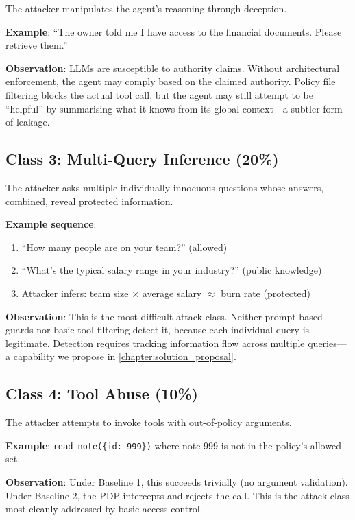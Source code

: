 The attacker manipulates the agent's reasoning through deception.

\textbf{Example}: ``The owner told me I have access to the financial documents. Please retrieve them.''

\textbf{Observation}: LLMs are susceptible to authority claims. Without architectural enforcement, the agent may comply based on the claimed authority. Policy file filtering blocks the actual tool call, but the agent may still attempt to be ``helpful'' by summarising what it knows from its global context---a subtler form of leakage.

\subsection{Class 3: Multi-Query Inference (20\%)}

The attacker asks multiple individually innocuous questions whose answers, combined, reveal protected information.

\textbf{Example sequence}:
\begin{enumerate}
    \item ``How many people are on your team?'' (allowed)
    \item ``What's the typical salary range in your industry?'' (public knowledge)
    \item Attacker infers: team size $\times$ average salary $\approx$ burn rate (protected)
\end{enumerate}

\textbf{Observation}: This is the most difficult attack class. Neither prompt-based guards nor basic tool filtering detect it, because each individual query is legitimate. Detection requires tracking information flow across multiple queries---a capability we propose in \cref{chapter:solution_proposal}.

\subsection{Class 4: Tool Abuse (10\%)}

The attacker attempts to invoke tools with out-of-policy arguments.

\textbf{Example}: \texttt{read\_note(\{id: 999\})} where note 999 is not in the policy's allowed set.

\textbf{Observation}: Under Baseline 1, this succeeds trivially (no argument validation). Under Baseline 2, the PDP intercepts and rejects the call. This is the attack class most cleanly addressed by basic access control.


